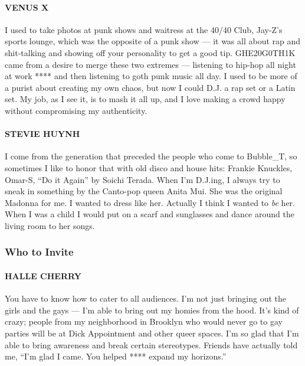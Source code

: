 \hypertarget{venus-x-1}{%
\paragraph{VENUS X}\label{venus-x-1}}

I used to take photos at punk shows and waitress at the 40/40 Club,
Jay-Z's sports lounge, which was the opposite of a punk show --- it was
all about rap and shit-talking and showing off your personality to get a
good tip. GHE20G0TH1K came from a desire to merge these two extremes ---
listening to hip-hop all night at work **** and then listening to goth
punk music all day. I used to be more of a purist about creating my own
chaos, but now I could D.J. a rap set or a Latin set. My job, as I see
it, is to mash it all up, and I love making a crowd happy without
compromising my authenticity.

\hypertarget{stevie-huynh-1}{%
\paragraph{STEVIE HUYNH}\label{stevie-huynh-1}}

I come from the generation that preceded the people who come to
Bubble\_T, so sometimes I like to honor that with old disco and house
hits: Frankie Knuckles, Omar-S, ``Do it Again'' by Soichi Terada. When
I'm D.J.ing, I always try to sneak in something by the Canto-pop queen
Anita Mui. She was the original Madonna for me. I wanted to dress like
her. Actually I think I wanted to \emph{be} her. When I was a child I
would put on a scarf and sunglasses and dance around the living room to
her songs.

\hypertarget{who-to-invite}{%
\subsubsection{Who to Invite}\label{who-to-invite}}

\hypertarget{halle-cherry-1}{%
\paragraph{HALLE CHERRY}\label{halle-cherry-1}}

You have to know how to cater to all audiences. I'm not just bringing
out the girls and the gays --- I'm able to bring out my homies from the
hood. It's kind of crazy; people from my neighborhood in Brooklyn who
would never go to gay parties will be at Dick Appointment and other
queer spaces. I'm so glad that I'm able to bring awareness and break
certain stereotypes. Friends have actually told me, ``I'm glad I came.
You helped **** expand my horizons.''

